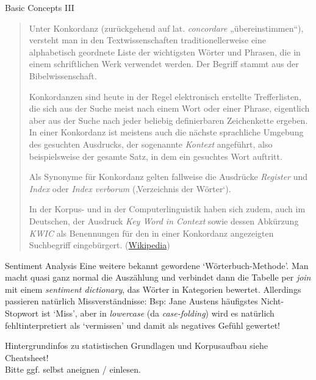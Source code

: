 \documentclass[10pt]{beamer}
\begin{document}
\begin{frame}[allowframebreaks]{Basic Concepts III}

\begin{quote}\tiny
    Unter Konkordanz (zurückgehend auf lat. \emph{concordare} „übereinstimmen“), versteht man in den Textwissenschaften traditionellerweise eine alphabetisch geordnete Liste der wichtigsten Wörter und Phrasen, die in einem schriftlichen Werk verwendet werden. Der Begriff stammt aus der Bibelwissenschaft. \punkti

    Konkordanzen sind heute in der Regel elektronisch erstellte Trefferlisten, die sich aus der Suche meist nach einem Wort oder einer Phrase, eigentlich aber aus der Suche nach jeder beliebig definierbaren Zeichenkette ergeben. In einer Konkordanz ist meistens auch die nächste sprachliche Umgebung des gesuchten Ausdrucks, der sogenannte \emph{Kontext} angeführt, also beispielsweise der gesamte Satz, in dem ein gesuchtes Wort auftritt.
    
    Als Synonyme für Konkordanz gelten fallweise die Ausdrücke \emph{Register} und \emph{Index} oder \emph{Index verborum} (‚Verzeichnis der Wörter‘). 
    
    In der Korpus- und in der Computerlinguistik haben sich zudem, auch im Deutschen, der Ausdruck \emph{Key Word in Context} sowie dessen Abkürzung \emph{KWIC} als Benennungen für den in einer Konkordanz angezeigten Suchbegriff eingebürgert.  (\href{https://de.wikipedia.org/wiki/Konkordanz_(Textwissenschaft)}{Wikipedia})
\end{quote}

\end{frame}

\begin{frame}[allowframebreaks]{Sentiment Analysis}
Eine weitere bekannt gewordene `Wörterbuch-Methode'. Man macht quasi ganz normal die Auszählung und verbindet dann die Tabelle per \emph{join} mit einem \emph{sentiment dictionary}, das Wörter in Kategorien bewertet. Allerdings passieren natürlich Missverständnisse: Bsp: Jane Austens häufigstes Nicht-Stopwort ist `Miss', aber in \emph{lowercase} (da \emph{case-folding}) wird es natürlich fehltinterpretiert als `vermissen' und damit als negatives Gefühl gewertet!
\end{frame}

\begin{frame}[standout]
Hintergrundinfos zu \alert{statistischen Grundlagen} und \alert{Korpusaufbau} siehe Cheatsheet! \\
\footnotesize Bitte ggf. selbst aneignen / einlesen.
\end{frame}
\end{document}
